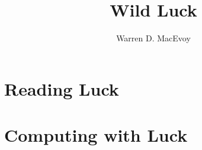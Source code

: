 \documentclass{tufte-book}
\title{Wild Luck}
\author[W. MacEvoy]{Warren D. MacEvoy}
\theoremstyle{definition}
\theoremstyle{example}
\theoremstyle{plain}
\begin{document}
\renewcommand{\allcaps}[1]{\textsmallcaps{#1}}
\renewcommand{\smallcaps}[1]{\textsmallcaps{#1}}
\renewcommand{\allcapsspacing}[1]{#1}
\renewcommand{\smallcapsspacing}[1]{#1}
\renewcommand{\textsc}[1]{\textsmallcaps{#1}}

\frontmatter
\maketitle



\tableofcontents

\mainmatter

\part{Reading Luck}

% 
% 

\part{Computing with Luck}
% 
% 
% 
% 
% 
% 
% 

\backmatter
% 
% 
\end{document}
